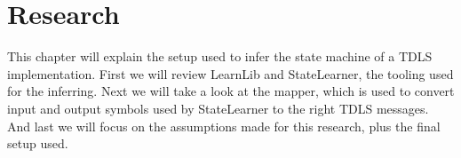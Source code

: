 \chapter{Research}\label{research}

This chapter will explain the setup used to infer the state machine of a TDLS implementation.
First we will review LearnLib and StateLearner, the tooling used for the inferring. Next we will take a look at the mapper, which is used to convert input and output symbols used by StateLearner to the right TDLS messages. And last we will focus on the assumptions made for this research, plus the final setup used.




